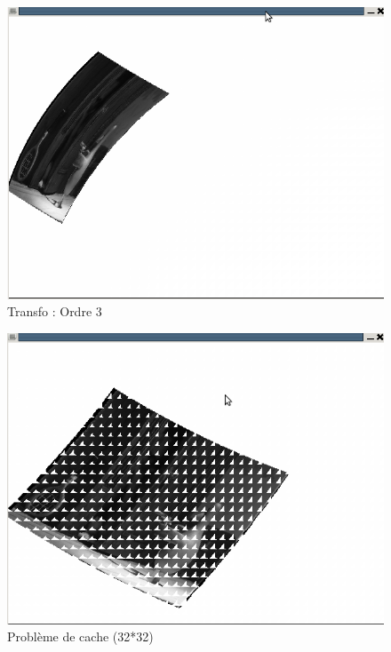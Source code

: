 \documentclass{beamer}
\begin{document}
\begin{frame}
\begin{figure}[!h]
\centering
\includegraphics[scale = 0.3]{ordre3_bis.png}
\caption{Transfo : Ordre 3}
\end{figure}
\end{frame}


\begin{frame}
\begin{figure}[!h]
\centering
\includegraphics[scale = 0.3]{transfo_pb_cache.png}
\caption{Problème de cache (32*32)}
\end{figure}
\end{frame}
\end{document}
